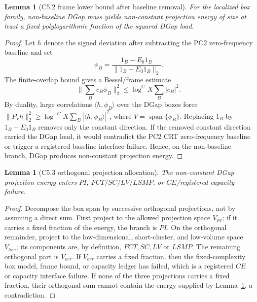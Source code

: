 \documentclass[11pt]{article}
\newtheorem{lemma}[theorem]{Lemma}
\theoremstyle{definition}
\begin{document}
\begin{lemma}[C5.2 frame lower bound after baseline removal]\label{lem:c5-frame}
For the localized box family, non-baseline DGap mass yields non-constant projection energy of size at least a fixed polylogarithmic fraction of the squared DGap load.
\end{lemma}
\begin{proof}
Let $h$ denote the signed deviation after subtracting the PC2 zero-frequency baseline and set
\[
  \phi_B=\frac{1_B-E_0 1_B}{\|1_B-E_0 1_B\|_2}.
\]
The finite-overlap bound gives a Bessel/frame estimate
\[
  \Big\|\sum_B c_B\phi_B\Big\|_2^2\le \log^C X\sum_B|c_B|^2.
\]
By duality, large correlations $\langle h,\phi_B\rangle$ over the DGap boxes force $\|P_Vh\|_2^2\ge\log^{-C}X\sum_B|\langle h,\phi_B\rangle|^2$, where $V=\operatorname{span}\{\phi_B\}$.  Replacing $1_B$ by $1_B-E_0 1_B$ removes only the constant direction.  If the removed constant direction carried the DGap load, it would contradict the PC2 CRT zero-frequency baseline or trigger a registered baseline interface failure.  Hence, on the non-baseline branch, DGap produces non-constant projection energy.
\end{proof}

\begin{lemma}[C5.3 orthogonal projection allocation]\label{lem:c5-orthogonal}
The non-constant DGap projection energy enters $PI$, $FCT/SC/LV/LSMP$, or $CE$/registered capacity failure.
\end{lemma}
\begin{proof}
Decompose the box span by successive orthogonal projections, not by assuming a direct sum.  First project to the allowed projection space $V_{PI}$; if it carries a fixed fraction of the energy, the branch is $PI$.  On the orthogonal remainder, project to the low-dimensional, short-cluster, and low-volume space $V_{low}$; its components are, by definition, $FCT,SC,LV$ or $LSMP$.  The remaining orthogonal part is $V_{err}$.  If $V_{err}$ carries a fixed fraction, then the fixed-complexity box model, frame bound, or capacity ledger has failed, which is a registered $CE$ or capacity interface failure.  If none of the three projections carries a fixed fraction, their orthogonal sum cannot contain the energy supplied by Lemma~\ref{lem:c5-frame}, a contradiction.
\end{proof}
\end{document}
